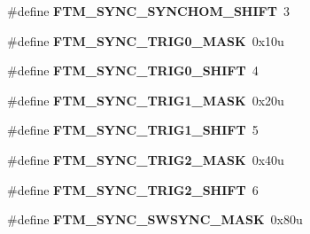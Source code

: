 \begin{DoxyCompactItemize}
\item 
\hypertarget{group___f_t_m___register___masks_ga9f4fbe85603aa455463585444e27dbb3}{}\#define {\bfseries F\+T\+M\+\_\+\+S\+Y\+N\+C\+\_\+\+S\+Y\+N\+C\+H\+O\+M\+\_\+\+S\+H\+I\+F\+T}~3\label{group___f_t_m___register___masks_ga9f4fbe85603aa455463585444e27dbb3}

\item 
\hypertarget{group___f_t_m___register___masks_ga5ee32a648ec1a88f07ea32b9a680684b}{}\#define {\bfseries F\+T\+M\+\_\+\+S\+Y\+N\+C\+\_\+\+T\+R\+I\+G0\+\_\+\+M\+A\+S\+K}~0x10u\label{group___f_t_m___register___masks_ga5ee32a648ec1a88f07ea32b9a680684b}

\item 
\hypertarget{group___f_t_m___register___masks_ga1b676aad473928dd52e5d757149ab445}{}\#define {\bfseries F\+T\+M\+\_\+\+S\+Y\+N\+C\+\_\+\+T\+R\+I\+G0\+\_\+\+S\+H\+I\+F\+T}~4\label{group___f_t_m___register___masks_ga1b676aad473928dd52e5d757149ab445}

\item 
\hypertarget{group___f_t_m___register___masks_gab2caa82ba7f028e7a696a8e02b7f87ac}{}\#define {\bfseries F\+T\+M\+\_\+\+S\+Y\+N\+C\+\_\+\+T\+R\+I\+G1\+\_\+\+M\+A\+S\+K}~0x20u\label{group___f_t_m___register___masks_gab2caa82ba7f028e7a696a8e02b7f87ac}

\item 
\hypertarget{group___f_t_m___register___masks_ga44401f020ce66143ee97582e21332fe9}{}\#define {\bfseries F\+T\+M\+\_\+\+S\+Y\+N\+C\+\_\+\+T\+R\+I\+G1\+\_\+\+S\+H\+I\+F\+T}~5\label{group___f_t_m___register___masks_ga44401f020ce66143ee97582e21332fe9}

\item 
\hypertarget{group___f_t_m___register___masks_gaf1b0377ca3de3fac73b014406084a05b}{}\#define {\bfseries F\+T\+M\+\_\+\+S\+Y\+N\+C\+\_\+\+T\+R\+I\+G2\+\_\+\+M\+A\+S\+K}~0x40u\label{group___f_t_m___register___masks_gaf1b0377ca3de3fac73b014406084a05b}

\item 
\hypertarget{group___f_t_m___register___masks_gafd88ca49160a6fb4bb24f6ed57180b87}{}\#define {\bfseries F\+T\+M\+\_\+\+S\+Y\+N\+C\+\_\+\+T\+R\+I\+G2\+\_\+\+S\+H\+I\+F\+T}~6\label{group___f_t_m___register___masks_gafd88ca49160a6fb4bb24f6ed57180b87}

\item 
\hypertarget{group___f_t_m___register___masks_gaa3cb833bf90ebaf61a187b421a956a30}{}\#define {\bfseries F\+T\+M\+\_\+\+S\+Y\+N\+C\+\_\+\+S\+W\+S\+Y\+N\+C\+\_\+\+M\+A\+S\+K}~0x80u\label{group___f_t_m___register___masks_gaa3cb833bf90ebaf61a187b421a956a30}


\end{DoxyCompactItemize}
